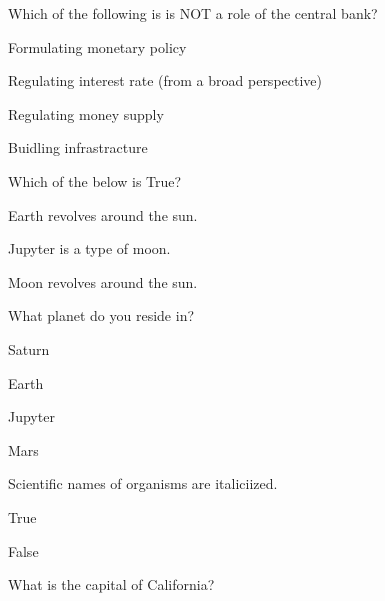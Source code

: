 \documentclass[12pt]{exam}
\begin{document}
\begin{questions}

    \question Which of the following is is NOT a role of the central bank?
    
        \begin{oneparchoices}
        
            \choice Formulating monetary policy
        
            \choice Regulating interest rate (from a broad perspective)
        
            \choice Regulating money supply
        
            \choice Buidling infrastracture
        
        \end{oneparchoices}

    \question Which of the below is True?
    
        \begin{oneparchoices}
        
            \choice Earth revolves around the sun.
        
            \choice Jupyter is a type of moon.
        
            \choice Moon revolves around the sun.
        
        \end{oneparchoices}

    \question What planet do you reside in?
    
        \begin{oneparchoices}
        
            \choice Saturn
        
            \choice Earth
        
            \choice Jupyter
        
            \choice Mars
        
        \end{oneparchoices}

    \question Scientific names of organisms are italiciized.
    
        \begin{oneparchoices}
        
            \choice True
        
            \choice False
        
        \end{oneparchoices}

    \question What is the capital of California?
    

\end{questions}
\end{document}
